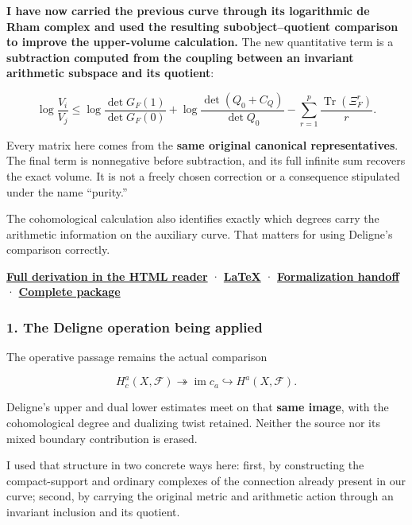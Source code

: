 \textbf{I have now carried the previous curve through its logarithmic de Rham complex and used the resulting subobject--quotient comparison to improve the upper-volume calculation.} The new quantitative term is a \textbf{subtraction computed from the coupling between an invariant arithmetic subspace and its quotient}:

\[
\boxed{
\log\frac{V_i}{V_j}
\le
\log\frac{\det G_F(1)}{\det G_F(0)}
+
\log\frac{\det(Q_0+C_Q)}{\det Q_0}
-
\sum_{r=1}^{p}\frac{\operatorname{Tr}(\Xi_F^r)}{r}.
}
\]

Every matrix here comes from the \textbf{same original canonical representatives}. The final term is nonnegative before subtraction, and its full infinite sum recovers the exact volume. It is not a freely chosen correction or a consequence stipulated under the name ``purity.''

The cohomological calculation also identifies exactly which degrees carry the arithmetic information on the auxiliary curve. That matters for using Deligne's comparison correctly.

\href{sources/endpoint_user_sources/HISTORICAL_DOWNLOAD_LINKS.md}{\textbf{Full derivation in the HTML reader}} · \href{sources/endpoint_user_sources/HISTORICAL_DOWNLOAD_LINKS.md}{\textbf{LaTeX}} · \href{sources/endpoint_user_sources/HISTORICAL_DOWNLOAD_LINKS.md}{\textbf{Formalization handoff}} · \href{sources/endpoint_user_sources/HISTORICAL_DOWNLOAD_LINKS.md}{\textbf{Complete package}}

\subsubsection{1. The Deligne operation being applied}\label{endpoint-exponential_constituent_original--the-deligne-operation-being-applied}

The operative passage remains the actual comparison

\[
H_c^a(X,\mathcal F)
\twoheadrightarrow
\operatorname{im}c_a
\hookrightarrow
H^a(X,\mathcal F).
\]

Deligne's upper and dual lower estimates meet on that \textbf{same image}, with the cohomological degree and dualizing twist retained. Neither the source nor its mixed boundary contribution is erased.

I used that structure in two concrete ways here: first, by constructing the compact-support and ordinary complexes of the connection already present in our curve; second, by carrying the original metric and arithmetic action through an invariant inclusion and its quotient.

